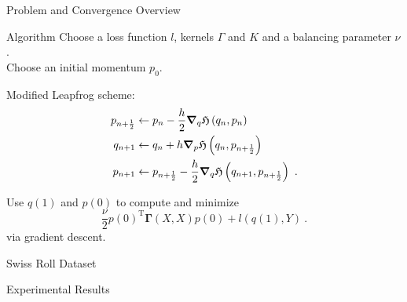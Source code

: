 \documentclass[8pt]{beamer}
\newcommand{\cX}{\mathcal{X}}
\newcommand{\cY}{\mathcal{Y}}
\newcommand{\fH}{\mathfrak{H}}
\newcommand{\T}{\mathrm{T}}
\begin{document}
	\begin{frame}{Problem and Convergence Overview}
		
	\end{frame}

	\begin{frame}{Algorithm}
		Choose a loss function $l$, kernels $\Gamma$ and $K$ and a balancing parameter $\nu$.\\
		Choose an initial momentum $p_0$.
		
		Modified Leapfrog scheme:
		\begin{align*}
			p_{n+\frac{1}{2}} &\gets p_n - \frac{h}{2} \grad_q\fH\left(q_n, p_n\right) \\
			q_{n+1} &\gets q_n + h \grad_p\fH\left(q_n, p_{n+\frac{1}{2}}\right)\\
			p_{n+1} &\gets p_{n+\frac{1}{2}} - \frac{h}{2} \grad_q\fH\left(q_{n+1}, p_{n+\frac{1}{2}}\right) \ .
		\end{align*}
		
		Use $q(1)$ and $p(0)$ to compute and minimize
		\begin{equation*}
			\frac{\nu}{2} p(0)^\T \mathbf{\Gamma}(X, X)p(0) + l(q(1), Y) \ .
		\end{equation*}
		via gradient descent.
	\end{frame}

	\begin{frame}{Swiss Roll Dataset}
		
	\end{frame}

	\begin{frame}{Experimental Results}
		
	\end{frame}


	\begin{frame}
		
		
	\end{frame}
\end{document}
